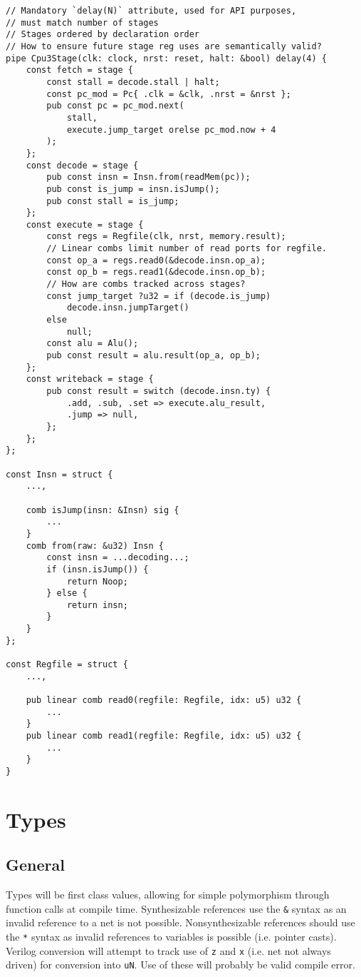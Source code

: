 \documentclass[10pt]{article}
\begin{document}
\begin{verbatim}
// Mandatory `delay(N)` attribute, used for API purposes,
// must match number of stages
// Stages ordered by declaration order
// How to ensure future stage reg uses are semantically valid?
pipe Cpu3Stage(clk: clock, nrst: reset, halt: &bool) delay(4) {
    const fetch = stage {
        const stall = decode.stall | halt;
        const pc_mod = Pc{ .clk = &clk, .nrst = &nrst };
        pub const pc = pc_mod.next(
            stall,
            execute.jump_target orelse pc_mod.now + 4
        );
    };
    const decode = stage {
        pub const insn = Insn.from(readMem(pc));
        pub const is_jump = insn.isJump();
        pub const stall = is_jump;
    };
    const execute = stage {
        const regs = Regfile(clk, nrst, memory.result);
        // Linear combs limit number of read ports for regfile.
        const op_a = regs.read0(&decode.insn.op_a);
        const op_b = regs.read1(&decode.insn.op_b);
        // How are combs tracked across stages?
        const jump_target ?u32 = if (decode.is_jump)
            decode.insn.jumpTarget()
        else
            null;
        const alu = Alu();
        pub const result = alu.result(op_a, op_b);
    };
    const writeback = stage {
        pub const result = switch (decode.insn.ty) {
            .add, .sub, .set => execute.alu_result,
            .jump => null,
        };
    };
};

const Insn = struct {
    ...,

    comb isJump(insn: &Insn) sig {
        ...
    }
    comb from(raw: &u32) Insn {
        const insn = ...decoding...;
        if (insn.isJump()) {
            return Noop;
        } else {
            return insn;
        }
    }
};

const Regfile = struct {
    ...,

    pub linear comb read0(regfile: Regfile, idx: u5) u32 {
        ...
    }
    pub linear comb read1(regfile: Regfile, idx: u5) u32 {
        ...
    }
}
\end{verbatim}

\section{Types}

\subsection{General}
Types will be first class values, allowing for simple polymorphism through function calls at compile
time. Synthesizable references use the \verb|&| syntax as an invalid reference to a net is not possible.
Nonsynthesizable references should use the \verb|*| syntax as invalid references to variables is possible
(i.e. pointer casts). Verilog conversion will attempt to track use of \verb|z| and \verb|x| (i.e.
net not always driven) for conversion into \verb|uN|. Use of these will probably be valid compile
error.
\end{document}
